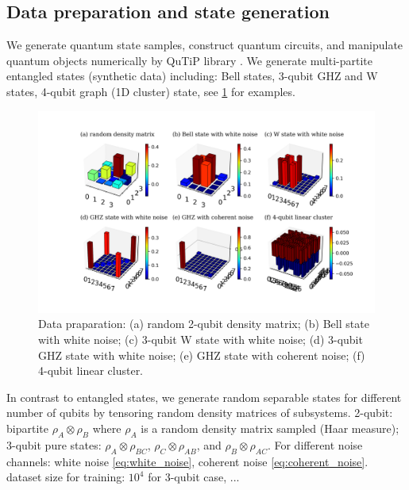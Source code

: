\documentclass[
reprint,
aps,
pra,
floatfix,
]{revtex4-2}
\theoremstyle{plain}
\theoremstyle{definition}
\newcommand{\dm}{\rho}
\begin{document}
\subsection{Data preparation and state generation}\label{sec:data}
We generate quantum state samples, construct quantum circuits, and manipulate quantum objects numerically by QuTiP library \cite{johanssonQuTiPPythonFramework2013} \cite{liPulselevelNoisyQuantum2022}.
We generate multi-partite entangled states (synthetic data) including: Bell states, 3-qubit GHZ and W states, 4-qubit graph (1D cluster) state, see \cref{fig:sample_data} for examples.
\begin{figure}[!ht]
	\centering
	\includegraphics[width=.9\linewidth]{./Code/dataset_sample_3x2.png}
	\caption{Data praparation: (a) random 2-qubit density matrix; (b) Bell state with white noise; (c) 3-qubit W state with white noise; (d) 3-qubit GHZ state with white noise; (e) GHZ state with coherent noise; (f) 4-qubit linear cluster.}
	\label{fig:sample_data}
\end{figure}
In contrast to entangled states, we generate random separable states for different number of qubits by tensoring random density matrices of subsystems.
2-qubit: bipartite $\rho_A\otimes \rho_B$ where $\rho_A$ is a random density matrix sampled (Haar measure);
3-qubit pure states: $\dm_A\otimes \dm_{BC}$, $\dm_C\otimes \dm_{AB}$, and $\dm_B\otimes \dm_{AC}$.
For different noise channels: white noise \cref{eq:white_noise}, coherent noise \cref{eq:coherent_noise}.
dataset size for training: $10^4$ for 3-qubit case, ...
\end{document}
